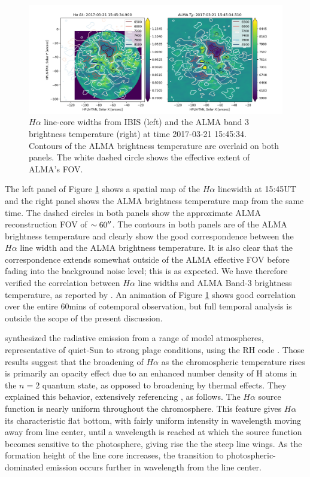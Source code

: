 \documentclass[twocolumn]{aastex62}
\newcommand{\figref}[1]{Figure \ref{#1}}
\newcommand{\halpha}{\ensuremath{H\alpha}}
\begin{document}
\begin{figure}
    \centering
    \includegraphics[width=\linewidth]{figures/IBIS_wdth_ALMA_tb_0100.png}
    \caption{\halpha{} line-core widths from IBIS (left) and the ALMA band 3 brightness temperature (right) at time 2017-03-21 15:45:34.  Contours of the ALMA brightness temperature are overlaid on both panels.  The white dashed circle shows the effective extent of ALMA's FOV.}
    \label{fig:almaibis}
\end{figure}

The left panel of \figref{fig:almaibis} shows a spatial map of the \halpha{} linewidth at 15:45UT and the right panel shows the ALMA brightness temperature map from the same time.
The dashed circles in both panels show the approximate ALMA reconstruction FOV of $\sim60\mbox{$^{\prime\prime}$}{}$.
The contours in both panels are of the ALMA brightness temperature and clearly show the good correspondence between the \halpha{} line width and the ALMA brightness temperature.
It is also clear that the correspondence extends somewhat outside of the ALMA effective FOV before fading into the background noise level; this is as expected.
We have therefore verified the correlation between \halpha{} line widths and ALMA Band-3 brightness temperature, as reported by \citet{2019Molnar}.
An animation of \figref{fig:almaibis} shows good correlation over the entire 60mins of cotemporal observation, but full temporal analysis is outside the scope of the present discussion.

\citet{2019Molnar} synthesized the radiative emission from a range of model atmospheres, representative of quiet-Sun to strong plage conditions, using the RH code \citep{2001Uitenbroek}.  
Those results suggest that the broadening of \halpha{} as the chromospheric temperature rises is primarily an opacity effect due to an enhanced number density of H atoms in the $n=2$ quantum state, as opposed to broadening by thermal effects.  
They explained this behavior, extensively referencing \citet{2012Leenaarts}, as follows.  The \halpha{} source function is nearly uniform throughout the chromosphere.  
This feature gives \halpha{} its characteristic flat bottom, with fairly uniform intensity in wavelength moving away from line center, until a wavelength is reached at which the source function becomes sensitive to the photosphere, giving rise the the steep line wings.  
As the formation height of the line core increases, the transition to photospheric-dominated emission occurs further in wavelength from the line center.  
\end{document}
